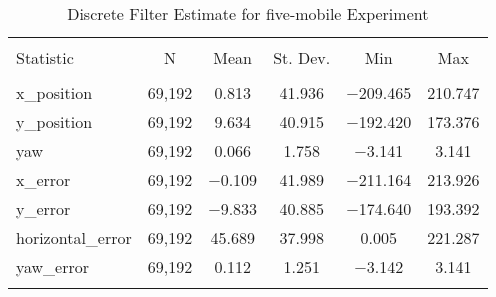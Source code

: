 
\begin{table}[h] \centering 
  \caption{Discrete Filter Estimate for five-mobile Experiment} 
  \label{tab:five_mobile_discrete_summary} 
\begin{tabular}{@{\extracolsep{5pt}}lccccc} 
\\[-1.8ex]\hline 
\hline \\[-1.8ex] 
Statistic & \multicolumn{1}{c}{N} & \multicolumn{1}{c}{Mean} & \multicolumn{1}{c}{St. Dev.} & \multicolumn{1}{c}{Min} & \multicolumn{1}{c}{Max} \\ 
\hline \\[-1.8ex] 
x\_position & 69,192 & 0.813 & 41.936 & $-$209.465 & 210.747 \\ 
y\_position & 69,192 & 9.634 & 40.915 & $-$192.420 & 173.376 \\ 
yaw & 69,192 & 0.066 & 1.758 & $-$3.141 & 3.141 \\ 
x\_error & 69,192 & $-$0.109 & 41.989 & $-$211.164 & 213.926 \\ 
y\_error & 69,192 & $-$9.833 & 40.885 & $-$174.640 & 193.392 \\ 
horizontal\_error & 69,192 & 45.689 & 37.998 & 0.005 & 221.287 \\ 
yaw\_error & 69,192 & 0.112 & 1.251 & $-$3.142 & 3.141 \\ 
\hline \\[-1.8ex] 
\end{tabular} 
\end{table} 

